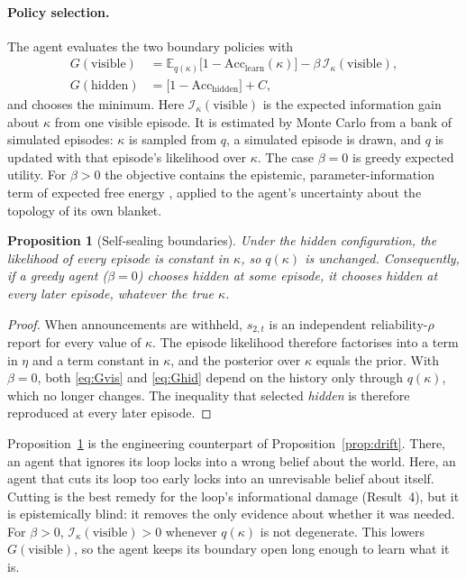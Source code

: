 \documentclass[11pt]{article}
\newtheorem{proposition}{Proposition}
\theoremstyle{definition}
\theoremstyle{remark}
\begin{document}
\paragraph{Policy selection.} The agent evaluates the two boundary policies with
\begin{align}
G(\text{visible}) &= \mathbb{E}_{q(\kappa)}\big[1-\mathrm{Acc}_{\text{learn}}(\kappa)\big]
  -\beta\,\mathcal{I}_\kappa(\text{visible}),\label{eq:Gvis}\\
G(\text{hidden}) &= \big[1-\mathrm{Acc}_{\text{hidden}}\big]+C,\label{eq:Ghid}
\end{align}
and chooses the minimum. Here $\mathcal{I}_\kappa(\text{visible})$ is the
expected information gain about $\kappa$ from one visible episode. It is
estimated by Monte Carlo from a bank of simulated episodes: $\kappa$ is sampled
from $q$, a simulated episode is drawn, and $q$ is updated with that episode's
likelihood over $\kappa$. The case $\beta=0$ is greedy expected utility. For
$\beta>0$ the objective contains the epistemic, parameter-information term of
expected free energy \citep{friston2017curiosity,schwartenbeck2019}, applied to
the agent's uncertainty about the topology of its own blanket.

\begin{proposition}[Self-sealing boundaries]\label{prop:sealing}
Under the hidden configuration, the likelihood of every episode is constant in
$\kappa$, so $q(\kappa)$ is unchanged. Consequently, if a greedy agent
($\beta=0$) chooses \emph{hidden} at some episode, it chooses \emph{hidden} at
every later episode, whatever the true $\kappa$.
\end{proposition}

\begin{proof}
When announcements are withheld, $s_{2,t}$ is an independent reliability-$\rho$
report for every value of $\kappa$. The episode likelihood therefore factorises
into a term in $\eta$ and a term constant in $\kappa$, and the posterior over
$\kappa$ equals the prior. With $\beta=0$, both \eqref{eq:Gvis} and
\eqref{eq:Ghid} depend on the history only through $q(\kappa)$, which no longer
changes. The inequality that selected \emph{hidden} is therefore reproduced at
every later episode.
\end{proof}

Proposition~\ref{prop:sealing} is the engineering counterpart of
Proposition~\ref{prop:drift}. There, an agent that ignores its loop locks into a
wrong belief about the world. Here, an agent that cuts its loop too early locks
into an unrevisable belief about itself. Cutting is the best remedy for the
loop's informational damage (Result~4), but it is epistemically blind: it
removes the only evidence about whether it was needed. For $\beta>0$,
$\mathcal{I}_\kappa(\text{visible})>0$ whenever $q(\kappa)$ is not degenerate.
This lowers $G(\text{visible})$, so the agent keeps its boundary open long
enough to learn what it is.
\end{document}
